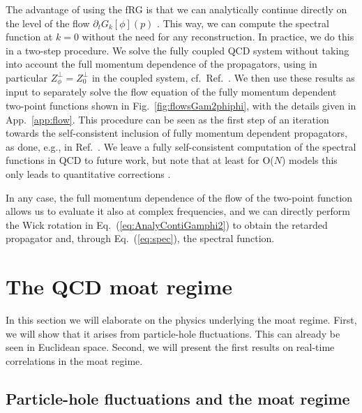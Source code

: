 \documentclass[reprint,english,superscriptaddress,preprintnumbers,amsmath,amssymb,aps,prd,nofootinbib]{revtex4-2}
\def\Eq#1{Eq.~(\ref{#1})}
\def\Fig#1{Fig.~\ref{#1}}
\def\App#1{App.~\ref{#1}}
\begin{document}
The advantage of using the fRG is that we can analytically continue directly on the level of the flow $\partial_t G_k[\phi](p)$ \cite{Floerchinger:2011sc, Strodthoff:2011tz}. This way, we can compute the spectral function at $k=0$ without the need for any reconstruction. In practice, we do this in a two-step procedure. We solve the fully coupled QCD system without taking into account the full momentum dependence of the propagators, using in particular $Z_\phi^\perp = Z_0^\perp$ in the coupled system, cf.\ Ref.\ \cite{Fu:2019hdw}. We then use these results as input to separately solve the flow equation of the fully momentum dependent two-point functions shown in \Fig{fig:flowsGam2phiphi}, with the details given in \App{app:flow}. 
This procedure can be seen as the first step of an iteration towards the self-consistent inclusion of fully momentum dependent propagators, as done, e.g., in Ref.\ \cite{Helmboldt:2014iya}. We leave a fully self-consistent computation of the spectral functions in QCD to future work, but note that at least for O($N$) models this only leads to quantitative corrections \cite{Strodthoff:2016pxx, Horak:2023hkp, Jung:2021ipc}.

In any case, the full momentum dependence of the flow of the two-point function allows us to evaluate it also at complex frequencies, and we can directly perform the Wick rotation in \Eq{eq:AnalyContiGamphi2} to obtain the retarded propagator and, through \Eq{eq:spec}, the spectral function. 








%
\section{The QCD moat regime}

In this section we will elaborate on the physics underlying the moat regime. First, we will show that it arises from particle-hole fluctuations. This can already be seen in Euclidean space. Second, we will present the first results on real-time correlations in the moat regime.  

\subsection{Particle-hole fluctuations and the moat regime}\label{sec:PH}
\end{document}

